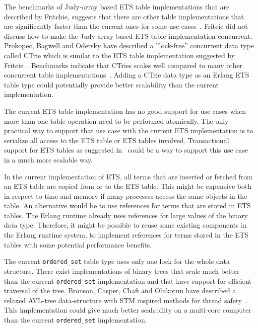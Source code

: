 \documentclass[aps,pre,preprint,nofootinbib]{revtex4}
\begin{document}
  The benchmarks of Judy-array based ETS table implementations that are described by Fritchie, suggests that there are other table implementations that are significantly faster than the current ones for some use cases~\cite{ScottEtsJudy}.
  Fritcie did not discuss how to make the Judy-array based ETS table implementation concurrent.
  Prokopec, Bagwell and Odersky have described a ''lock-free'' concurrent data type called CTrie which is similar to the ETS table implementation suggested by Fritcie~\cite{ProkopecCTrie}.
  Benchmarks indicate that CTries scales well compared to many other concurrent table implementations~\cite{ProkopecCTrie}.
  Adding a CTrie data type as an Erlang ETS table type could potentially provide better scalability than the current implementation.
  
  The current ETS table implementation has no good support for use cases when more than one table operation need to be performed atomically.
  The only practical way to support that use case with the current ETS implementation is to serialize all access to the ETS table or ETS tables involved.
  Transactional support for ETS tables as suggested in~\cite{PatrikErlangTrans} could be a way to support this use case in a much more scalable way.
  
  In the current implementation of ETS, all terms that are inserted or fetched from an ETS table are copied from or to the ETS table.
  This might be expensive both in respect to time and memory if many processes access the same objects in the table.
  An alternative would be to use references for terms that are stored in ETS tables. 
  The Erlang runtime already uses references for large values of the binary data type.
  Therefore, it might be possible to reuse some existing components in the Erlang runtime system, to implement references for terms stored in the ETS tables with some potential performance benefits.
  
  The current \verb|ordered_set| table type uses only one lock for the whole data structure. 
  There exist implementations of binary trees that scale much better than the current \verb|ordered_set| implementation and that have support for efficient traversal of the tree.
  Bronson, Casper, Chafi and Olukotun have described a relaxed AVL-tree data-structure with STM inspired methods for thread safety~\cite{BronsonPracTree}.
  This implementation could give much better scalability on a multi-core computer than the current \verb|ordered_set| implementation.
  

  


  
\end{document}
